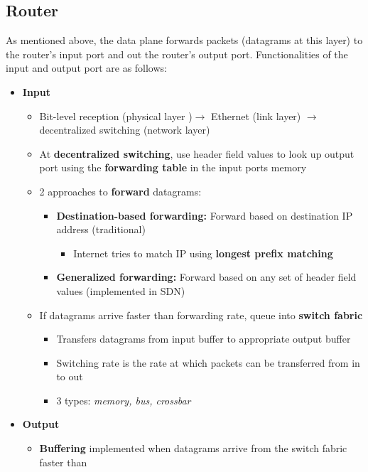 \documentclass{article}
\begin{document}
\subsection{Router}
As mentioned above, the data plane forwards packets (datagrams at this layer) to the router's input
port and out the router's output port. Functionalities of the input and output port are as follows:
\begin{itemize}
    \item \textbf{Input}
    \begin{itemize}
        \item Bit-level reception (physical layer )$\rightarrow$ Ethernet (link layer) $\rightarrow$ decentralized 
        switching (network layer)
        \item At \textbf{decentralized switching}, use header field values to look up output port
        using the \textbf{forwarding table} in the input ports memory
        \item 2 approaches to \textbf{forward} datagrams:
        \begin{itemize}
            \item \textbf{Destination-based forwarding:} Forward based on destination IP address (traditional)
            \begin{itemize}
                \item Internet tries to match IP using \textbf{longest prefix matching} 
            \end{itemize}
            \item \textbf{Generalized forwarding:} Forward based on any set of header field values (implemented in SDN)
        \end{itemize}
        \item If datagrams arrive faster than forwarding rate, queue into \textbf{switch fabric}
        \begin{itemize}
            \item Transfers datagrams from input buffer to appropriate output buffer
            \item Switching rate is the rate at which packets can be transferred from in to out
            \item 3 types: \textit{memory, bus, crossbar}
        \end{itemize}
    \end{itemize}
    \item \textbf{Output}
    \begin{itemize}
        \item \textbf{Buffering} implemented when datagrams arrive from the switch fabric faster than

\end{itemize}
\end{itemize}
\end{document}
